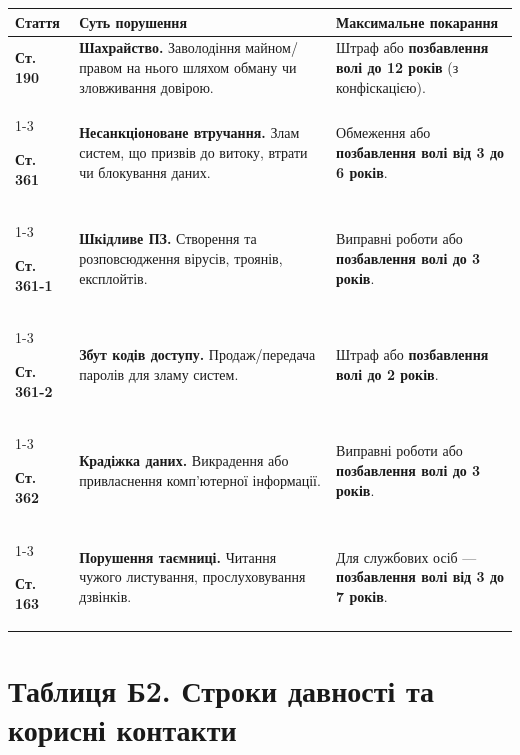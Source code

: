 \begin{table}[H]
    \centering
    \renewcommand{\arraystretch}{1.4}
    \begin{tabularx}{\textwidth}{@{} l X X @{}}
        \toprule
        \textbf{Стаття} & \textbf{Суть порушення} & \textbf{Максимальне покарання} \\
        \midrule
        
        \textbf{Ст. 190} & 
        \textbf{Шахрайство.} Заволодіння майном/правом на нього шляхом обману чи зловживання довірою. & 
        Штраф або \textbf{позбавлення волі до 12 років} (з конфіскацією). \\
        \cmidrule{1-3}
        
        \textbf{Ст. 361} & 
        \textbf{Несанкціоноване втручання.} Злам систем, що призвів до витоку, втрати чи блокування даних. & 
        Обмеження або \textbf{позбавлення волі від 3 до 6 років}. \\
        \cmidrule{1-3}
        
        \textbf{Ст. 361-1} & 
        \textbf{Шкідливе ПЗ.} Створення та розповсюдження вірусів, троянів, експлойтів. & 
        Виправні роботи або \textbf{позбавлення волі до 3 років}. \\
        \cmidrule{1-3}  

        \textbf{Ст. 361-2} & 
        \textbf{Збут кодів доступу.} Продаж/передача паролів для зламу систем. & 
        Штраф або \textbf{позбавлення волі до 2 років}. \\
        \cmidrule{1-3}
        
        \textbf{Ст. 362} & 
        \textbf{Крадіжка даних.} Викрадення або привласнення комп'ютерної інформації. & 
        Виправні роботи або \textbf{позбавлення волі до 3 років}. \\
        \cmidrule{1-3}
        
        \textbf{Ст. 163} & 
        \textbf{Порушення таємниці.} Читання чужого листування, прослуховування дзвінків. & 
        Для службових осіб — \textbf{позбавлення волі від 3 до 7 років}. \\
        
        \bottomrule
    \end{tabularx}
\end{table}

\vspace{0.5cm}

\section*{Таблиця Б2. Строки давності та корисні контакти}

